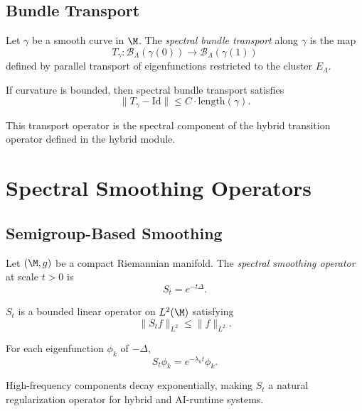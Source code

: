 \subsection{Bundle Transport}

\begin{definition}
Let $\gamma$ be a smooth curve in $\M$.  
The \emph{spectral bundle transport} along $\gamma$ is the map
\[
T_\gamma : \mathcal{B}_\Lambda(\gamma(0)) \to \mathcal{B}_\Lambda(\gamma(1))
\]
defined by parallel transport of eigenfunctions restricted to the cluster
$E_\Lambda$.
\end{definition}

\begin{lemma}
If curvature is bounded, then spectral bundle transport satisfies
\[
\|T_\gamma - \mathrm{Id}\|
\le C \cdot \mathrm{length}(\gamma).
\]
\end{lemma}

\begin{remark}
This transport operator is the spectral component of the hybrid
transition operator defined in the hybrid module.
\end{remark}

\section{Spectral Smoothing Operators}

\subsection{Semigroup-Based Smoothing}

\begin{definition}
Let $(\M,g)$ be a compact Riemannian manifold.  
The \emph{spectral smoothing operator} at scale $t > 0$ is
\[
S_t = e^{-t\Delta}.
\]
\end{definition}

\begin{lemma}
$S_t$ is a bounded linear operator on $L^2(\M)$ satisfying
\[
\|S_t f\|_{L^2} \le \|f\|_{L^2}.
\]
\]
\end{lemma}

\begin{theorem}
For each eigenfunction $\phi_k$ of $-\Delta$,
\[
S_t \phi_k = e^{-\lambda_k t} \phi_k.
\]
\]
\end{theorem}

\begin{remark}
High-frequency components decay exponentially, making $S_t$ a natural
regularization operator for hybrid and AI-runtime systems.
\end{remark}

